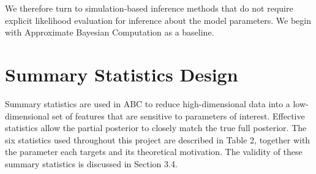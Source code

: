 \documentclass[12pt, a4paper]{article}
\begin{document}
We therefore turn to simulation-based inference methods that do not require explicit likelihood evaluation for inference about the model parameters. We begin with Approximate Bayesian Computation as a baseline.

\section{Summary Statistics Design}
Summary statistics are used in ABC to reduce high-dimensional data into a low-dimensional set of features that are sensitive to parameters of interest. Effective statistics allow the partial posterior to closely match the true full posterior. The six statistics used throughout this project are described in Table 2, together with the parameter each targets and its theoretical motivation. The validity of these summary statistics is discussed in Section 3.4.
\end{document}
